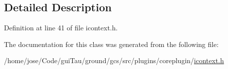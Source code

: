 \subsection{Detailed Description}


Definition at line 41 of file icontext.\-h.



The documentation for this class was generated from the following file\-:\begin{DoxyCompactItemize}
\item 
/home/jose/\-Code/gui\-Tau/ground/gcs/src/plugins/coreplugin/\hyperlink{icontext_8h}{icontext.\-h}\end{DoxyCompactItemize}
